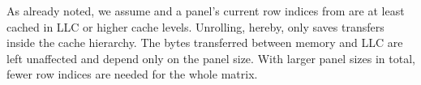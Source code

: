 As already noted, we assume \vr{} and a panel's current row indices from
\vindx{} are at least cached in LLC or higher cache levels.
%
Unrolling, hereby, only saves transfers inside the cache hierarchy.
The bytes transferred between memory and LLC are left unaffected and depend only
on the panel size.
With larger panel sizes in total, fewer
row indices \vindx{} are needed for the
whole matrix.

